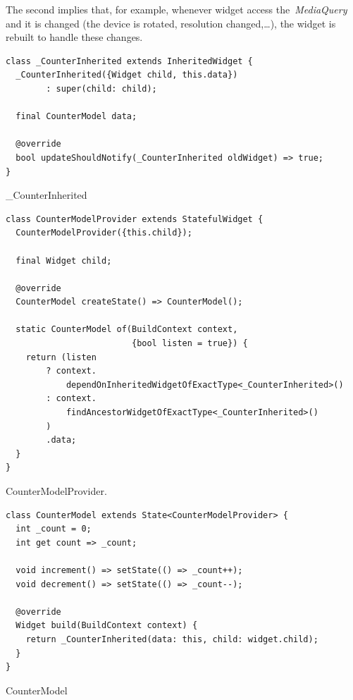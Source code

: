 The second implies that, for example, whenever widget access the~\textit{MediaQuery} and it is changed (the device is rotated, resolution changed,\ldots ), the widget is rebuilt to handle these changes. 

\begin{listing}[ht]
\begin{verbatim}
class _CounterInherited extends InheritedWidget {
  _CounterInherited({Widget child, this.data}) 
        : super(child: child);

  final CounterModel data;

  @override
  bool updateShouldNotify(_CounterInherited oldWidget) => true;
}
\end{verbatim}
\caption{\_CounterInherited}
\label{listing:counter-inherited-counter-inherited}
\end{listing}

\begin{listing}[ht]
\begin{verbatim}
class CounterModelProvider extends StatefulWidget {
  CounterModelProvider({this.child});
  
  final Widget child;
  
  @override
  CounterModel createState() => CounterModel();

  static CounterModel of(BuildContext context, 
                         {bool listen = true}) {
    return (listen
        ? context.
            dependOnInheritedWidgetOfExactType<_CounterInherited>()
        : context.
            findAncestorWidgetOfExactType<_CounterInherited>()
        )
        .data;
  }
}
\end{verbatim}
\caption{CounterModelProvider.}
\label{listing:counter-inherited-model-provider}
\end{listing}

\begin{listing}[ht]
\begin{verbatim}
class CounterModel extends State<CounterModelProvider> {
  int _count = 0;
  int get count => _count;

  void increment() => setState(() => _count++);
  void decrement() => setState(() => _count--);

  @override
  Widget build(BuildContext context) {
    return _CounterInherited(data: this, child: widget.child);
  }
}
\end{verbatim}
\caption{CounterModel}
\label{listing:counter-inherited-counter-model}
\end{listing}

